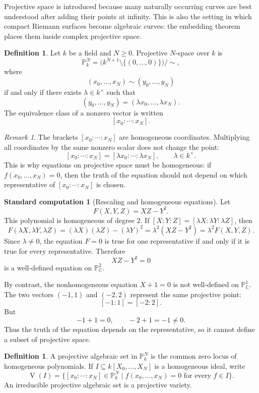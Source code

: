 \documentclass[11pt]{article}
\theoremstyle{definition}
\newtheorem{definition}[theorem]{Definition}
\newtheorem{calculation}[theorem]{Standard computation}
\theoremstyle{remark}
\newtheorem{remark}[theorem]{Remark}
\newcommand{\C}{\mathbb{C}}
\newcommand{\Pj}{\mathbb{P}}
\newcommand{\V}{\operatorname{V}}
\begin{document}
Projective space is introduced because many naturally occurring curves are
best understood after adding their points at infinity.  This is also the
setting in which compact Riemann surfaces become algebraic curves: the
embedding theorem places them inside complex projective space.

\begin{definition}
Let \(k\) be a field and \(N\geq 0\).  Projective \(N\)-space over \(k\) is
\[
  \Pj^N_k
  =
  \bigl(k^{N+1}\setminus\{(0,\ldots,0)\}\bigr)\big/{\sim},
\]
where
\[
  (x_0,\ldots,x_N)\sim (y_0,\ldots,y_N)
\]
if and only if there exists \(\lambda\in k^\times\) such that
\[
  (y_0,\ldots,y_N)=(\lambda x_0,\ldots,\lambda x_N).
\]
The equivalence class of a nonzero vector is written
\[
  [x_0:\cdots:x_N].
\]
\end{definition}

\begin{remark}
The brackets \([x_0:\cdots:x_N]\) are homogeneous coordinates.  Multiplying
all coordinates by the same nonzero scalar does not change the point:
\[
  [x_0:\cdots:x_N]=[\lambda x_0:\cdots:\lambda x_N],
  \qquad \lambda\in k^\times.
\]
This is why equations on projective space must be homogeneous: if
\(f(x_0,\ldots,x_N)=0\), then the truth of the equation should not depend on
which representative of \([x_0:\cdots:x_N]\) is chosen.
\end{remark}

\begin{calculation}[Rescaling and homogeneous equations]
Let
\[
  F(X,Y,Z)=XZ-Y^2.
\]
This polynomial is homogeneous of degree \(2\).  If
\([X:Y:Z]=[\lambda X:\lambda Y:\lambda Z]\), then
\[
  F(\lambda X,\lambda Y,\lambda Z)
  =
  (\lambda X)(\lambda Z)-(\lambda Y)^2
  =
  \lambda^2(XZ-Y^2)
  =
  \lambda^2 F(X,Y,Z).
\]
Since \(\lambda\neq 0\), the equation \(F=0\) is true for one representative
if and only if it is true for every representative.  Therefore
\[
  XZ-Y^2=0
\]
is a well-defined equation on \(\Pj^2_{\C}\).

By contrast, the nonhomogeneous equation \(X+1=0\) is not well-defined on
\(\Pj^1_{\C}\).  The two vectors \((-1,1)\) and \((-2,2)\) represent the same
projective point:
\[
  [-1:1]=[-2:2].
\]
But
\[
  -1+1=0,\qquad -2+1=-1\neq 0.
\]
Thus the truth of the equation depends on the representative, so it cannot
define a subset of projective space.
\end{calculation}

\begin{definition}
A projective algebraic set in \(\Pj^N_k\) is the common zero locus of
homogeneous polynomials.  If \(I\subseteq k[X_0,\ldots,X_N]\) is a homogeneous
ideal, write
\[
  \V(I)=\{[x_0:\cdots:x_N]\in \Pj^N_k
  \mid f(x_0,\ldots,x_N)=0\text{ for every }f\in I\}.
\]
An irreducible projective algebraic set is a projective variety.
\end{definition}
\end{document}

